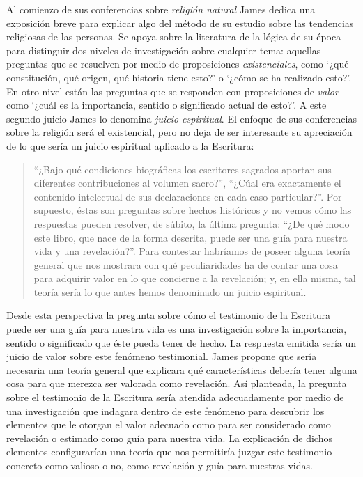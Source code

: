 Al comienzo de sus conferencias sobre \emph{religión natural} James dedica una exposición breve para explicar algo del método de su estudio sobre las tendencias religiosas de las personas. Se apoya sobre la literatura de la lógica de su época para distinguir dos niveles de investigación sobre cualquier tema: aquellas preguntas que se resuelven por medio de proposiciones \emph{existenciales}, como \enquote*{¿qué constitución, qué origen, qué historia tiene esto?} o \enquote*{¿cómo se ha realizado esto?}. En otro nivel están las preguntas que se responden con proposiciones de \emph{valor} como \enquote*{¿cuál es la importancia, sentido o significado actual de esto?}. A este segundo juicio James lo denomina \emph{juicio espiritual}. El enfoque de sus conferencias sobre la religión será el existencial, pero no deja de ser interesante su apreciación de lo que sería un juicio espiritual aplicado a la Escritura:

\blockquote[{\cite[27]{james2002variedades}}]{\enquote{¿Bajo qué condiciones biográficas los escritores sagrados aportan sus diferentes contribuciones al volumen sacro?}, \enquote{¿Cúal era exactamente el contenido intelectual de sus declaraciones en cada caso particular?}. Por supuesto, éstas son preguntas sobre hechos históricos y no vemos cómo las respuestas pueden resolver, de súbito, la última pregunta: \enquote{¿De qué modo este libro, que nace de la forma descrita, puede ser una guía para nuestra vida y una revelación?}. Para contestar habríamos de poseer alguna teoría general que nos mostrara con qué peculiaridades ha de contar una cosa para adquirir valor en lo que concierne a la revelación; y, en ella misma, tal teoría sería lo que antes hemos denominado un juicio espiritual.}

Desde esta perspectiva la pregunta sobre cómo el testimonio de la Escritura puede ser una guía para nuestra vida es una investigación sobre la importancia, sentido o significado que éste pueda tener de hecho. La respuesta emitida sería un juicio de valor sobre este fenómeno testimonial. James propone que sería necesaria una teoría general que explicara qué características debería tener alguna cosa para que merezca ser valorada como revelación. Así planteada, la pregunta sobre el testimonio de la Escritura sería atendida adecuadamente por medio de una investigación que indagara dentro de este fenómeno para descubrir los elementos que le otorgan el valor adecuado como para ser considerado como revelación o estimado como guía para nuestra vida. La explicación de dichos elementos configurarían una teoría que nos permitiría juzgar este testimonio concreto como valioso o no, como revelación y guía para nuestras vidas.

